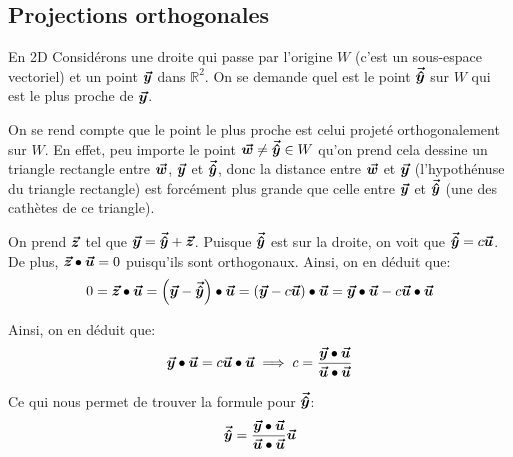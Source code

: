 \documentclass[a4paper]{article}
\begin{document}
\subsection{Projections orthogonales}
\begin{parag}{En 2D}
    Considérons une droite qui passe par l'origine $W$ (c'est un sous-espace vectoriel) et un point $\bm{\protect\vec{y}}$ dans $\mathbb{R}^2$.
    On se demande quel est le point $\bm{\protect\vec{\hat{y}}}$ sur $W$ qui est le plus proche de $\bm{\protect\vec{y}}$.


    On se rend compte que le point le plus proche est celui projeté orthogonalement sur $W$. En effet, peu importe le point $\bm{\protect\vec{w}} \neq \bm{\protect\vec{\hat{y}}}\in W$ qu'on prend cela dessine un triangle rectangle entre $\bm{\protect\vec{w}}$, $\bm{\protect\vec{y}}$ et $\bm{\protect\vec{\hat{y}}}$, donc la distance entre $\bm{\protect\vec{w}}$ et $\bm{\protect\vec{y}}$ (l'hypothénuse du triangle rectangle) est forcément plus grande que celle entre $\bm{\protect\vec{y}}$ et $\bm{\protect\vec{\hat{y}}}$ (une des cathètes de ce triangle).

    On prend $\bm{\protect\vec{z}}$ tel que $\bm{\protect\vec{y}} = \bm{\protect\vec{\hat{y}}} + \bm{\protect\vec{z}}$. Puisque $\bm{\protect\vec{\hat{y}}}$ est sur la droite, on voit que $\bm{\protect\vec{\hat{y}}} = c \bm{\protect\vec{u}}$. De plus, $\bm{\protect\vec{z}} \bullet \bm{\protect\vec{u}} = 0$ puisqu'ils sont orthogonaux. Ainsi, on en déduit que:
    \[0 = \bvec{z} \dotprod \bvec{u} = \left(\bvec{y} - \bvec{\hat{y}}\right) \dotprod \bvec{u} = \left(\bvec{y} - c \bvec{u}\right) \dotprod \bvec{u} = \bvec{y} \dotprod \bvec{u} - c \bvec{u} \dotprod \bvec{u}\]

    Ainsi, on en déduit que:
    \[\bm{\protect\vec{y}} \bullet \bm{\protect\vec{u}} = c \bm{\protect\vec{u}} \bullet \bm{\protect\vec{u}} \implies c = \frac{\bm{\protect\vec{y}} \bullet \bm{\protect\vec{u}}}{\bm{\protect\vec{u}} \bullet \bm{\protect\vec{u}}}\]

    Ce qui nous permet de trouver la formule pour $\bm{\protect\vec{\hat{y}}}$:
    \[\bm{\protect\vec{\hat{y}}} = \frac{\bm{\protect\vec{y}} \bullet \bm{\protect\vec{u}}}{\bm{\protect\vec{u}} \bullet \bm{\protect\vec{u}}} \bm{\protect\vec{u}}\]
\end{parag}
\end{document}
